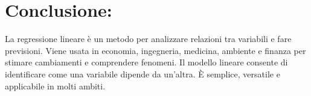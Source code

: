 \documentclass[11pt]{article}
\begin{document}
\section*{Conclusione:}
La regressione lineare è un metodo per analizzare relazioni tra variabili e fare previsioni. Viene usata in economia, ingegneria, medicina, ambiente e finanza 
per stimare cambiamenti e comprendere fenomeni. Il modello lineare consente di identificare come una variabile dipende da un'altra. È semplice, versatile e applicabile 
in molti ambiti.
\end{document}
